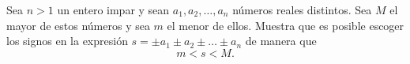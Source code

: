 Sea $n\gt 1$ un entero impar y sean $a_1,a_2,\dots, a_n$ números reales distintos. Sea $M$ el mayor de estos números y sea $m$ el menor de ellos. Muestra que es posible escoger los signos en la expresión $s=\pm a_1\pm a_2\pm \dots \pm a_n$ de manera que \[m\lt s\lt M.\]